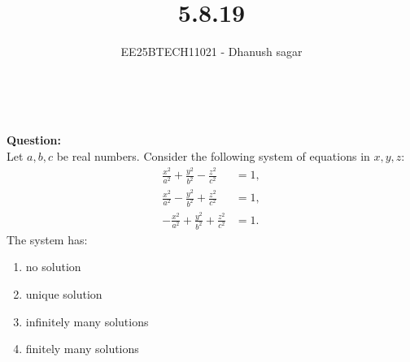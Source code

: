 \documentclass[journal]{IEEEtran}
\begin{document}


\title{5.8.19}
\author{EE25BTECH11021 - Dhanush sagar}
\maketitle \vspace{-1cm}
\renewcommand{\thefigure}{\theenumi}
\renewcommand{\thetable}{\theenumi}
\setlength{\intextsep}{10pt} %

\
\renewcommand{\thetable}{\theenumi}

\textbf{Question:}  \\
Let $a, b, c$ be real numbers. Consider the following system of equations in $x, y, z$:
\begin{align*}
\frac{x^2}{a^2} + \frac{y^2}{b^2} - \frac{z^2}{c^2} &= 1, \\
\frac{x^2}{a^2} - \frac{y^2}{b^2} + \frac{z^2}{c^2} &= 1, \\
-\frac{x^2}{a^2} + \frac{y^2}{b^2} + \frac{z^2}{c^2} &= 1.
\end{align*}
The system has:
\begin{enumerate}
    \item no solution
    \item unique solution
    \item infinitely many solutions
    \item finitely many solutions
\end{enumerate}
\end{document}
